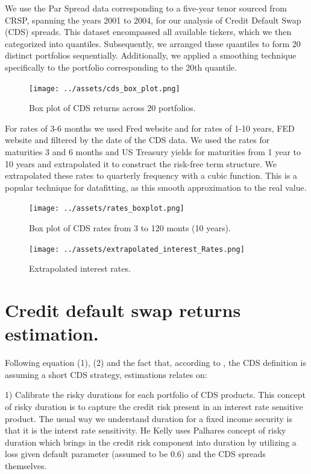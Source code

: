 \documentclass{article}
\begin{document}
\begin{Data science tools for finance final project}
We use the Par Spread data corresponding to a five-year tenor sourced from CRSP, spanning the years 2001 to 2004, for our analysis of Credit Default Swap (CDS) spreads. This dataset encompassed all available tickers, which we then categorized into quantiles. Subsequently, we arranged these quantiles to form 20 distinct portfolios sequentially. Additionally, we applied a smoothing technique specifically to the portfolio corresponding to the 20th quantile. 


\begin{figure}[H]
    \centering
    \texttt{[image: ../assets/cds\_box\_plot.png]}
    \caption{\label{fig:myplot}Box plot of CDS returns across 20 portfolios.}
    \end{figure}

For rates of 3-6 months we used Fred website and for rates of 1-10 years, FED website and filtered by the date of the CDS data. We used the rates for maturities 3 and 6 months and US Treasury yields for maturities from 1 year to 10 years and extrapolated it to construct the risk-free term structure.
We extrapolated these rates to quarterly frequency with a cubic function. This is a popular technique for datafitting, as this smooth approximation to the real value.

\begin{figure}[H]
    \centering
    \texttt{[image: ../assets/rates\_boxplot.png]}
    \caption{\label{fig:myplot}Box plot of CDS rates from 3 to 120 monts (10 years).}
    \end{figure}

\begin{figure}[H]
    \centering
    \texttt{[image: ../assets/extrapolated\_interest\_Rates.png]}
    \caption{\label{fig:myplot}Extrapolated interest rates.}
    \end{figure}    


\section{Credit default swap returns estimation.}
Following equation (1), (2) and the fact that, according to \cite{kelly2017}, the CDS definition is assuming a short CDS strategy, estimations relates on:

1) Calibrate the risky durations for each portfolio of CDS products. This concept of risky duration is to capture the credit risk present in an interest rate sensitive product. The usual way we understand duration for a fixed income security is that it is the interst rate sensitivity. He Kelly uses Palhares concept of risky duration which brings in the credit risk component into duration by utilizing a loss given default parameter (assumed to be 0.6) and the CDS spreads themselves. 


\end{Data science tools for finance final project}
\end{document}
